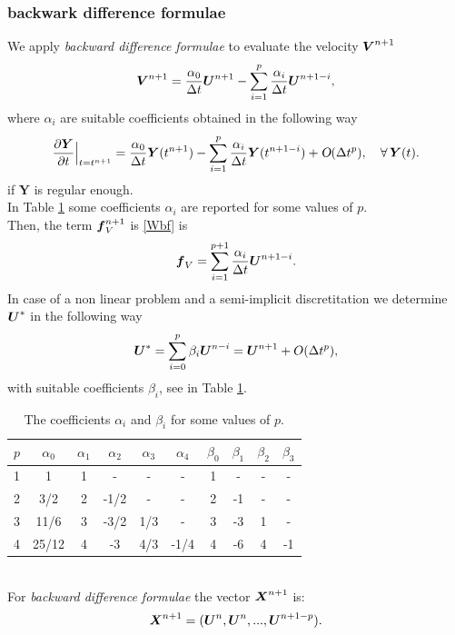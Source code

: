 \documentclass[english,a4paper]{article}
\newcommand{\Xbf}{\text{\mbox{\boldmath $X$}}}
\newcommand{\Ubf}{\text{\mbox{\boldmath $U$}}}
\newcommand{\fbf}{\text{\mbox{\boldmath $f$}}}
\newcommand{\Wbf}{\text{\mbox{\boldmath $V$}}}
\newcommand{\xx}{\boldsymbol}
\begin{document}
\subsubsection{backwark difference formulae}\label{bdf}%
We apply  {\sl backward difference formulae}  to evaluate  the velocity $\Wbf^{n+1}$   
\begin{equation}
\Wbf^{n+1}= \frac{\alpha_0}{\Delta t}\Ubf^{n+1}-\sum_{i=1}^p\frac{\alpha_i}{\Delta t} \xx U^{n+1-i},
\end{equation}
where  $\alpha_i$  are suitable coefficients obtained in the
following way
\begin{equation*}
\frac{\partial \xx Y}{\partial t}\Big|_{t=t^{n+1}} =
\frac{\alpha_0}{\Delta t}  \xx
Y(t^{n+1})-\sum_{i=1}^p\frac{\alpha_i}{\Delta t}\xx
Y(t^{n+1-i})+\textsl{O}(\Delta t^p),\quad \forall\, \xx Y(t). 
\end{equation*}
if $\xx Y$ is regular enough.\\
In Table \ref{alpha}  some coefficients
$\alpha_i$ are reported for some values of $p$.\\
Then, the term $\fbf_V^{n+1}$ is \eqref{Wbf} is
\begin{equation*}\label{ustart}
\displaystyle\fbf_V=\sum_{i=1}^{p+1}\frac{\alpha_i}{\Delta
  t}\Ubf^{n+1-i}.
\end{equation*}
In case of a non linear problem and a semi-implicit discretitation we determine  $\Ubf^*$ in the
following way
\begin{equation}\label{ustart}
\Ubf^*=\sum_{i=0}^p \beta_i\Ubf^{n-i}=\Ubf^{n+1}+O(\Delta t^p),
\end{equation}
with suitable coefficients  $\beta_i$, see  in Table \ref{alpha}.
\begin{table}[!h]
\begin{center}
\begin{tabular}{|c | c c c c c |c c c c| }
\hline
$p$ & $\alpha_0$ & $\alpha_1$ & $\alpha_2 $ & $\alpha_3$ & $\alpha_4$
& $\beta_0$ & $\beta_1$ & $\beta_2$ & $\beta_3$\\
\hline
1   &     1      &     1     &    -      &    -     &      -   &   1      &    -      &     -   &    -     \\
2   &     3/2    &     2     &   -1/2    &    -     &     -    &   2      &   -1      &     -   &    -     \\
3   &    11/6    &     3     &    -3/2   &    1/3   &     -    &   3      &   -3      &    1    &    -     \\
4   &    25/12   &     4     &   -3      &    4/3   &     -1/4 &   4      &   -6      &    4    &   -1     \\
\hline
\end{tabular}
\caption{The coefficients $\alpha_i$  and $\beta_i$ for some values of
$p$.}\label{alpha}
\end{center}
\end{table}
\\
For  {\sl backward difference formulae} the vector $\Xbf^{n+1}$ is:
$$\Xbf^{n+1}=(\Ubf^{n}, \Ubf^n,..., \Ubf^{n+1-p}).$$
\end{document}

